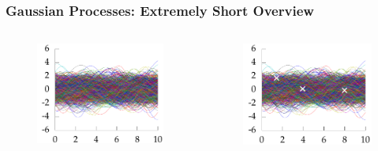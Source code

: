 \documentclass[10pt]{beamer}
\begin{document}
  \begin{frame}
    \frametitle{Gaussian Processes: Extremely Short Overview}

    \begin{columns}
      \begin{column}{0.33\textwidth}
        \begin{figure}
          \centering
          \includegraphics[width=\textwidth]{func1.png}
        \end{figure}
      \end{column}
      \pause
      \begin{column}{0.33\textwidth}
        \begin{figure}
          \centering
          \includegraphics[width=\textwidth]{func2.png}

\end{figure}
\end{column}
\end{columns}
\end{frame}
\end{document}

